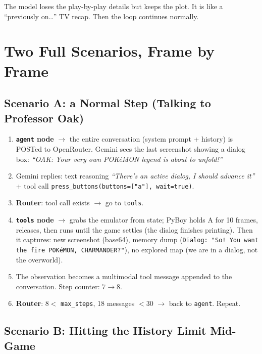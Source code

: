 \documentclass[11pt]{article}
\newcommand{\code}[1]{\texttt{#1}}
\begin{document}
The model loses the play-by-play details but keeps the plot. It is like a ``previously on\ldots'' TV recap. Then the loop continues normally.

\section{Two Full Scenarios, Frame by Frame}

\subsection{Scenario A: a Normal Step (Talking to Professor Oak)}

\begin{enumerate}[nosep]
  \item \textbf{\code{agent} node} $\rightarrow$ the entire conversation (system prompt + history) is POSTed to OpenRouter. Gemini sees the last screenshot showing a dialog box: \emph{``OAK: Your very own POKéMON legend is about to unfold!''}
  \item Gemini replies: text reasoning \emph{``There's an active dialog, I should advance it''} + tool call \code{press\_buttons(buttons=["a"], wait=true)}.
  \item \textbf{Router}: tool call exists $\rightarrow$ go to \code{tools}.
  \item \textbf{\code{tools} node} $\rightarrow$ grabs the emulator from state; PyBoy holds A for 10 frames, releases, then runs until the game settles (the dialog finishes printing). Then it captures: new screenshot (base64), memory dump (\code{Dialog: "So! You want the fire POKéMON, CHARMANDER?"}), no explored map (we are in a dialog, not the overworld).
  \item The observation becomes a multimodal tool message appended to the conversation. Step counter: $7 \rightarrow 8$.
  \item \textbf{Router}: $8 <$ \code{max\_steps}, 18 messages $< 30$ $\rightarrow$ back to \code{agent}. Repeat.
\end{enumerate}

\subsection{Scenario B: Hitting the History Limit Mid-Game}
\end{document}
